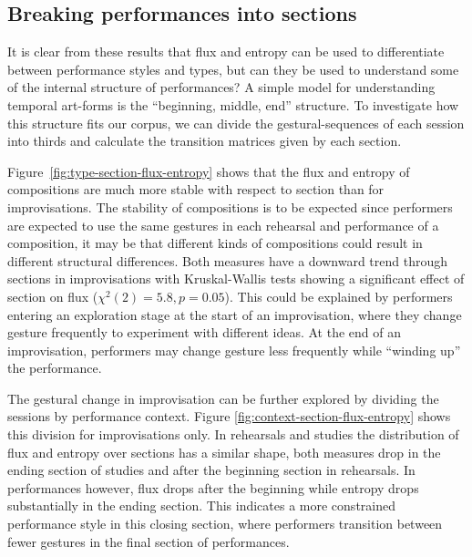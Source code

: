 \documentclass{sigchi}
\begin{document}
\subsection{Breaking performances into sections}

It is clear from these results that flux and entropy can be used to
differentiate between performance styles and types, but can they be
used to understand some of the internal structure of performances? A
simple model for understanding temporal art-forms is the ``beginning,
middle, end'' structure. To investigate how this structure fits our
corpus, we can divide the gestural-sequences of each session into
thirds and calculate the transition matrices given by each section.

Figure~\ref{fig:type-section-flux-entropy} shows that the flux and
entropy of compositions are much more stable with respect to section
than for improvisations. The stability of compositions is to be
expected since performers are expected to use the same gestures in
each rehearsal and performance of a composition, it may be that
different kinds of compositions could result in different structural
differences. Both measures have a downward trend through sections in
improvisations with Kruskal-Wallis tests showing a significant effect
of section on flux ($\chi^2(2)=5.8, p=0.05$). This could be explained
by performers entering an exploration stage at the start of an
improvisation, where they change gesture frequently to experiment with
different ideas. At the end of an improvisation, performers may change
gesture less frequently while ``winding up'' the performance.

The gestural change in improvisation can be further explored by
dividing the sessions by performance context. Figure
\ref{fig:context-section-flux-entropy} shows this division for
improvisations only. In rehearsals and studies the distribution of
flux and entropy over sections has a similar shape, both measures drop
in the ending section of studies and after the beginning section in
rehearsals. In performances however, flux drops after the beginning
while entropy drops substantially in the ending section. This
indicates a more constrained performance style in this closing
section, where performers transition between fewer gestures in the
final section of performances.


\end{document}
